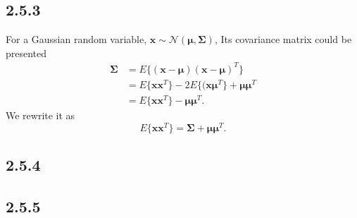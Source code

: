 \documentclass[a4paper, 11pt]{article}
\begin{document}
\subsection{2.5.3}
For a Gaussian random variable, $\mathbf{x}\sim \mathcal{N}(\boldsymbol{\boldsymbol{\mu},\boldsymbol{\Sigma}})$, Its covariance matrix could be presented
\begin{equation*}
\begin{split}
      \boldsymbol{\Sigma} &= E\{(\mathbf{x}-\boldsymbol{\mu})(\mathbf{x}-\boldsymbol{\mu})^T\}\\
      & = E\{\mathbf{x}\mathbf{x}^T\}-2E\{(\mathbf{x}\boldsymbol{\mu}^T\}+\boldsymbol{\mu}\boldsymbol{\mu}^T \\
      & =  E\{\mathbf{x}\mathbf{x}^T\} - \boldsymbol{\mu}\boldsymbol{\mu}^T .
\end{split}
\end{equation*}
We rewrite it as
\begin{equation*}
     E\{\mathbf{x}\mathbf{x}^T\} =    \boldsymbol{\Sigma}+\boldsymbol{\mu}\boldsymbol{\mu}^T.
\end{equation*}

\subsection{2.5.4}

\subsection{2.5.5}
\end{document}
